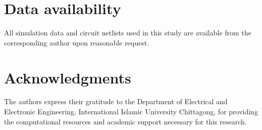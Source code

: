\documentclass[final,5p,times,twocolumn]{elsarticle}
\begin{document}
\section*{Data availability}

All simulation data and circuit netlists used in this study are available from the corresponding author upon reasonable request.

\section*{Acknowledgments}

The authors express their gratitude to the Department of Electrical and Electronic Engineering, International Islamic University Chittagong, for providing the computational resources and academic support necessary for this research.
\end{document}
